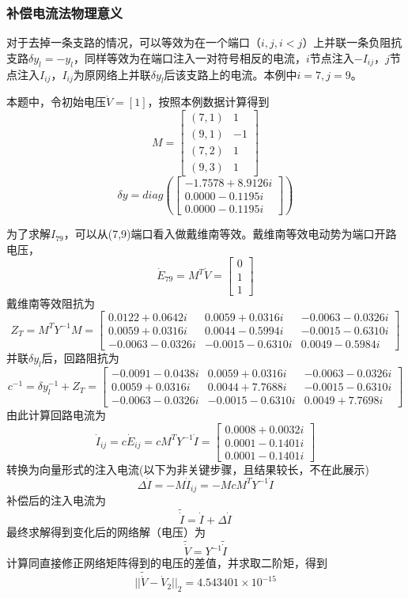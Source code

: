 \documentclass[a4paper,12pt]{article}
\begin{document}
    \subsubsection{补偿电流法物理意义}
    对于去掉一条支路的情况，可以等效为在一个端口（$i,j,i<j$）上并联一条负阻抗支路$\delta y_l=-y_l$，同样等效为在端口注入一对符号相反的电流，$i$节点注入$-I_{ij}$，$j$节点注入$I_{ij}$，$I_{ij}$为原网络上并联$\delta y_l$后该支路上的电流。本例中$i=7,j=9$。

    本题中，令初始电压$\dot V=[1]$，按照本例数据计算得到
    $$M=\begin{bmatrix}
      (7,1) & 1\\
      (9,1) & -1\\
      (7,2) & 1\\
      (9,3) & 1
    \end{bmatrix}$$
    $$\delta y=diag(\begin{bmatrix}
      -1.7578 + 8.9126i\\
      0.0000 - 0.1195i\\
      0.0000 - 0.1195i
    \end{bmatrix})$$

    为了求解$I_{79}$，可以从(7,9)端口看入做戴维南等效。戴维南等效电动势为端口开路电压，
    $$\dot E_{79}=M^T \dot V=\begin{bmatrix}
      0\\1\\1
    \end{bmatrix}$$
    戴维南等效阻抗为
    $$Z_T=M^TY^{-1}M=\begin{bmatrix}
    0.0122 + 0.0642i  & 0.0059 + 0.0316i & -0.0063 - 0.0326i\\
    0.0059 + 0.0316i  & 0.0044 - 0.5994i & -0.0015 - 0.6310i\\
    -0.0063 - 0.0326i & -0.0015 - 0.6310i &  0.0049 - 0.5984i
    \end{bmatrix}$$
    并联$\delta y_l$后，回路阻抗为
    $$c^{-1}=\delta y_l^{-1}+Z_T=\begin{bmatrix}
    -0.0091 - 0.0438i &  0.0059 + 0.0316i & -0.0063 - 0.0326i\\
    0.0059 + 0.0316i &  0.0044 + 7.7688i & -0.0015 - 0.6310i\\
    -0.0063 - 0.0326i & -0.0015 - 0.6310i&   0.0049 + 7.7698i
    \end{bmatrix}$$
    由此计算回路电流为
    $$\dot I_{ij}=c \dot E_{ij}=cM^TY^{-1}\dot I=\begin{bmatrix}
    0.0008 + 0.0032i\\
    0.0001 - 0.1401i\\
    0.0001 - 0.1401i
    \end{bmatrix}$$
    转换为向量形式的注入电流(以下为非关键步骤，且结果较长，不在此展示)
    $$\Delta \dot I=-M\dot I_{ij}=-McM^TY^{-1}\dot I$$
    补偿后的注入电流为
    $$\widetilde {\dot I} = \dot I + \Delta \dot I$$
    最终求解得到变化后的网络解（电压）为
    $$\widetilde {\dot V} = Y^{-1} \widetilde {\dot I}$$
    计算同直接修正网络矩阵得到的电压的差值，并求取二阶矩，得到
    $$||\widetilde {\dot V} - \dot V_2||_2=4.543401\times 10^{-15}$$
\end{document}
